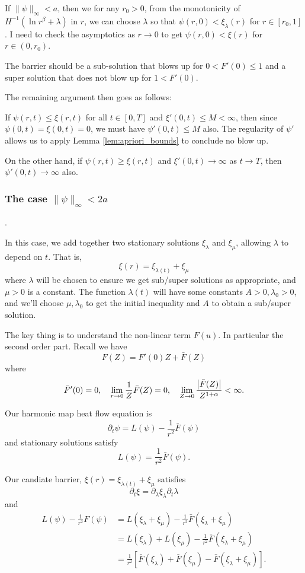 \documentclass{amsart}
\begin{document}
{\color{red}If \(\|\psi\|_{\infty} < a\), then we for any \(r_0 > 0\), from the monotonicity of \(H^{-1} (\ln r^{\beta} + \lambda)\) in \(r\), we can choose \(\lambda\) so that \(\psi(r, 0) < \xi_{\lambda}(r)\) for \(r \in [r_0, 1]\). I need to check the asymptotics as \(r\to 0\) to get \(\psi(r, 0) < \xi(r)\) for \(r \in (0, r_0)\).}

{\color{red}The barrier should be a sub-solution that blows up for \(0 < F'(0) \leq 1\)  and a super solution that does not blow up for \(1 < F'(0)\).}

{\color{red} The remaining argument then goes as follows:}

If \(\psi(r, t) \leq \xi(r, t)\) for all \(t \in [0, T]\) and \(\xi'(0, t) \leq M < \infty\), then since \(\psi(0, t) = \xi(0, t) = 0\), we must have \(\psi'(0, t) \leq M\) also. The regularity of \(\psi'\) allows us to apply Lemma \ref{lem:apriori_bounds} to conclude no blow up.

On the other hand, if \(\psi(r, t) \geq \xi(r, t)\) and \(\xi'(0, t) \to \infty\) as \(t \to T\), then \(\psi'(0, t) \to \infty\) also.

\subsubsection{The case \(\|\psi\|_{\infty} < 2a\)}.

In this case, we add together two stationary solutions \(\xi_{\lambda}\) and \(\xi_{\mu}\), allowing \(\lambda\) to depend on \(t\). That is,
\[
\xi(r) = \xi_{\lambda(t)} + \xi_{\mu}
\]
where \(\lambda\) will be chosen to ensure we get sub/super solutions as appropriate, and \(\mu > 0\) is a constant. The function \(\lambda(t)\) will have some constants \(A > 0, \lambda_0 > 0\), and we'll choose \(\mu, \lambda_0\) to get the initial inequality and \(A\) to obtain a sub/super solution.

The key thing is to understand the non-linear term \(F(u)\). In particular the second order part. Recall we have
\[
F(Z) = F'(0) Z + \bar{F}(Z)
\]
where
\[
\bar{F}'(0) = 0, \quad \lim_{r\to 0} \frac{1}{Z} \bar{F}(Z) = 0, \quad \lim_{Z\to 0} \frac{\left|{\bar{F}(Z)}\right|}{Z^{1+\alpha}} < \infty.
\]

Our harmonic map heat flow equation is
\[
\partial_t \psi = L(\psi) - \frac{1}{r^2} \bar{F}(\psi)
\]
and stationary solutions satisfy
\[
L(\psi) = \frac{1}{r^2} \bar{F}(\psi).
\]

Our candiate barrier, \(\xi(r) = \xi_{\lambda(t)} + \xi_{\mu}\) satisfies
\[
\partial_t \xi = \partial_{\lambda} \xi_{\lambda} \partial_t \lambda
\]
and
\[
\begin{split}
L(\psi) - \frac{1}{r^2} F(\psi) &= L(\xi_{\lambda} + \xi_{\mu}) - \frac{1}{r^2} \bar{F}(\xi_{\lambda} + \xi_{\mu}) \\
&= L(\xi_{\lambda}) + L(\xi_{\mu}) - \frac{1}{r^2} \bar{F}(\xi_{\lambda} + \xi_{\mu}) \\
&= \frac{1}{r^2}\left[\bar{F}(\xi_{\lambda}) + \bar{F}(\xi_{\mu}) - \bar{F}(\xi_{\lambda} + \xi_{\mu})\right].
\end{split}
\]
\end{document}
